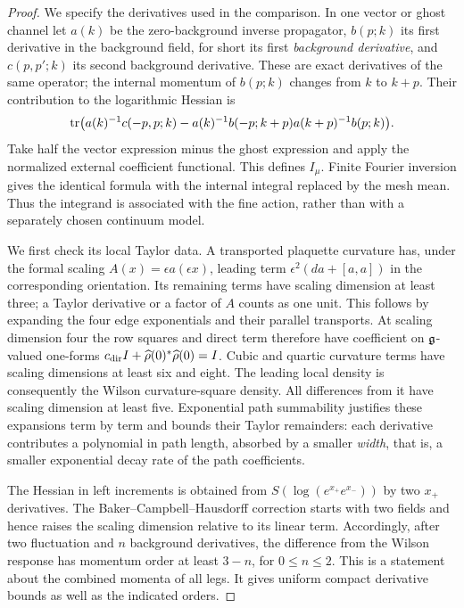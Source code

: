\begin{proof}
We specify the derivatives used in the comparison. In one vector or
ghost channel let $a(k)$ be the zero-background inverse propagator,
$b(p;k)$ its first derivative in the background field, for short its first \emph{background derivative}, and $c(p,p';k)$ its second
background derivative. These are exact derivatives of the same operator; the
internal momentum of $b(p;k)$ changes from $k$ to $k+p$.
Their contribution to the logarithmic Hessian is
\begin{equation}\label{ch07:response-integrand}
 \operatorname{tr}\bigl(a(k)^{-1}c(-p,p;k)
       -a(k)^{-1}b(-p;k+p)a(k+p)^{-1}b(p;k)\bigr).
\end{equation}
Take half the vector expression minus the ghost expression and apply
the normalized external coefficient functional. This defines $I_\mu$.
Finite Fourier inversion gives the identical formula with the internal
integral replaced by the mesh mean. Thus the integrand is associated
with the fine action, rather than with a separately chosen
continuum model.

We first check its local Taylor data. A transported plaquette curvature
has, under the formal scaling $A(x)=\epsilon a(\epsilon x)$,
leading term $\epsilon^2(da+[a,a])$ in the corresponding orientation.
Its remaining terms have scaling dimension at least three; a Taylor derivative or
a factor of $A$ counts as one unit. This follows by expanding the four
edge exponentials and their parallel transports. At scaling dimension four the row squares
and direct term therefore have coefficient on $\mathfrak g$-valued one-forms
$c_{\rm dir}I+\widehat\rho(0)^*\widehat\rho(0)=I$.
Cubic and quartic curvature terms have scaling dimensions at least six and eight.
The leading local density is consequently the Wilson curvature-square
density. All differences from it have scaling dimension at least five.
Exponential path summability justifies these expansions term by term
and bounds their Taylor remainders: each derivative contributes a polynomial
in path length, absorbed by a smaller \emph{width}, that is, a smaller exponential decay rate of the path coefficients.

The Hessian in left increments is obtained from
$S(\log(e^{x_+}e^{x_-}))$ by two $x_+$ derivatives. The
Baker--Campbell--Hausdorff correction starts with two fields and hence
raises the scaling dimension relative to its linear term. Accordingly, after two
fluctuation and $n$ background derivatives, the difference from the Wilson
response has momentum order at least $3-n$, for $0\le n\le2$.
This is a statement about the combined momenta of all legs. It gives
uniform compact derivative bounds as well as the indicated orders.


\end{proof}
